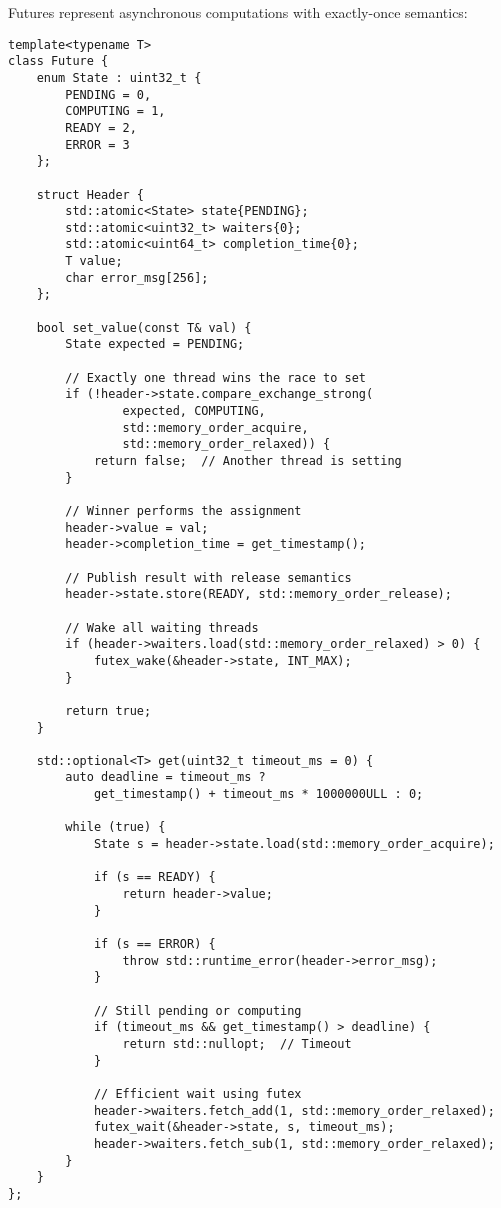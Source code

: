 \documentclass[11pt]{article}
\begin{document}
Futures represent asynchronous computations with exactly-once semantics:

\begin{lstlisting}[caption={Lock-Free Future with State Machine}]
template<typename T>
class Future {
    enum State : uint32_t {
        PENDING = 0,
        COMPUTING = 1, 
        READY = 2,
        ERROR = 3
    };
    
    struct Header {
        std::atomic<State> state{PENDING};
        std::atomic<uint32_t> waiters{0};
        std::atomic<uint64_t> completion_time{0};
        T value;
        char error_msg[256];
    };
    
    bool set_value(const T& val) {
        State expected = PENDING;
        
        // Exactly one thread wins the race to set
        if (!header->state.compare_exchange_strong(
                expected, COMPUTING,
                std::memory_order_acquire,
                std::memory_order_relaxed)) {
            return false;  // Another thread is setting
        }
        
        // Winner performs the assignment
        header->value = val;
        header->completion_time = get_timestamp();
        
        // Publish result with release semantics
        header->state.store(READY, std::memory_order_release);
        
        // Wake all waiting threads
        if (header->waiters.load(std::memory_order_relaxed) > 0) {
            futex_wake(&header->state, INT_MAX);
        }
        
        return true;
    }
    
    std::optional<T> get(uint32_t timeout_ms = 0) {
        auto deadline = timeout_ms ? 
            get_timestamp() + timeout_ms * 1000000ULL : 0;
        
        while (true) {
            State s = header->state.load(std::memory_order_acquire);
            
            if (s == READY) {
                return header->value;
            }
            
            if (s == ERROR) {
                throw std::runtime_error(header->error_msg);
            }
            
            // Still pending or computing
            if (timeout_ms && get_timestamp() > deadline) {
                return std::nullopt;  // Timeout
            }
            
            // Efficient wait using futex
            header->waiters.fetch_add(1, std::memory_order_relaxed);
            futex_wait(&header->state, s, timeout_ms);
            header->waiters.fetch_sub(1, std::memory_order_relaxed);
        }
    }
};
\end{lstlisting}
\end{document}
